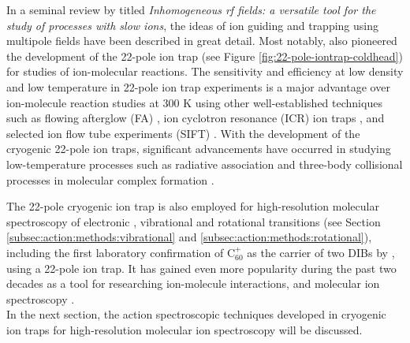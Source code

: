 In a seminal review by \citet{gerlich_inhomogeneous_1992} titled \emph{Inhomogeneous rf fields: a versatile tool for the study of processes with slow ions}, the ideas of ion guiding and trapping using multipole fields have been described in great detail. Most notably, \citet{gerlich_ion-neutral_1995} also pioneered the development of the 22-pole ion trap (see Figure \ref{fig:22-pole-iontrap-coldhead}) for studies of ion-molecular reactions. The sensitivity and efficiency at low density and low temperature in 22-pole ion trap experiments is a major advantage over ion-molecule reaction studies at 300 K using other well-established techniques such as flowing afterglow (FA) \cite{fehsenfeld_thermalenergy_1967}, ion cyclotron resonance (ICR) ion traps \cite{kim_icr_1975}, and selected ion flow tube experiments (SIFT) \cite{smith_laboratory_1978}. With the development of the cryogenic 22-pole ion traps, significant advancements have occurred in studying low-temperature processes such as radiative association and three-body collisional processes in molecular complex formation \cite{gerlich_experimental_1992, paul_dynamics_1995, paul_deuteration_1996}.

The 22-pole cryogenic ion trap is also employed for high-resolution molecular spectroscopy of electronic \cite{chakrabarty_novel_2013, campbell_laboratory_2015}, vibrational \cite{asvany_understanding_2005} and rotational \cite{Brunken2017} transitions (see Section \ref{subsec:action:methods:vibrational} and \ref{subsec:action:methods:rotational}), including the first laboratory confirmation  of C$_{60}^+$ as the carrier of two DIBs by \citet{campbell_laboratory_2015}, using a 22-pole ion trap. It has gained even more popularity during the past two decades as a tool for researching ion-molecule interactions, and molecular ion spectroscopy  \cite{redwine_novel_2013, asvany_coltrap_2014, gunther_berlintrap_2017, jusko_felion_2019, rap_low-temperature_2022}.\\

In the next section, the action spectroscopic techniques developed in cryogenic ion traps for high-resolution molecular ion spectroscopy will be discussed.
